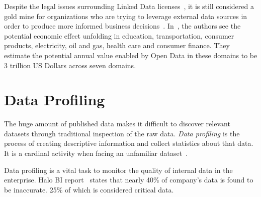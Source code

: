 \begin{figure}[ht!]
\end{figure}

Despite the legal issues surrounding Linked Data licenses~\cite{Prateek:Misc:13}, it is still considered a gold mine for organizations who are trying to leverage external data sources in order to produce more informed business decisions~\cite{Boyd:Article:11}. In~\cite{Manyika:Report:13}, the authors see the potential economic effect unfolding in education, transportation, consumer products, electricity, oil and gas, health care and consumer finance. They estimate the potential annual value enabled by Open Data in these domains to be 3 trillion US Dollars across seven domains.

\section{Data Profiling}\label{section:dataProfiling}

The huge amount of published data makes it difficult to discover relevant datasets through traditional inspection of the raw data. \textit{Data profiling} is the process of creating descriptive information and collect statistics about that data. It is a cardinal activity when facing an unfamiliar dataset~\cite{Li:WISM:12, Kimball:DWL:98}.

Data profiling is a vital task to monitor the quality of internal data in the enterprise. Halo BI report~\cite{Halo:TechReport:13} states that nearly 40\% of company's data is found to be inaccurate. 25\% of which is considered critical data.

